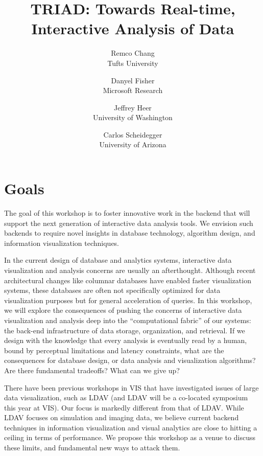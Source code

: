 \documentclass[journal]{vgtc}                %
\title{TRIAD: Towards Real-time, Interactive Analysis of Data}
\author{Remco Chang\\
	\scriptsize Tufts University 
	\and Danyel Fisher\\
	\scriptsize Microsoft Research 
	\and Jeffrey Heer\\
	\scriptsize University of Washington
 	\and Carlos Scheidegger\\
 	\scriptsize University of Arizona}
\begin{document}
\maketitle
\section{Goals}
The goal of this workshop is to foster innovative work in the backend that will support the next generation of interactive data analysis tools. 
We envision such backends to require novel insights in database technology, algorithm design, and information visualization techniques.

In the current design of database and analytics systems, interactive data visualization and analysis concerns are usually an afterthought. 
Although recent architectural changes like columnar databases have enabled faster visualization systems, these databases are often not specifically optimized for data visualization purposes but for general acceleration of queries. 
In this workshop, we will explore the consequences of pushing the concerns of interactive data visualization and analysis deep into the ``computational fabric'' of our systems: the back-end infrastructure of data storage, organization, and retrieval. 
If we design with the knowledge that every analysis is eventually read by a human, bound by perceptual limitations and latency constraints, what are the consequences for database design, or data analysis and visualization algorithms? 
Are there fundamental tradeoffs? 
What can we give up?

There have been previous workshops in VIS that have investigated issues of large data visualization, such as LDAV (and LDAV will be a co-located symposium this year at VIS). 
Our focus is markedly different from that of LDAV. 
While LDAV focuses on simulation and imaging data, we believe current backend techniques in information visualization and visual analytics are close to hitting a ceiling in terms of performance. 
We propose this workshop as a venue to discuss these limits, and fundamental new ways to attack them.
\end{document}
